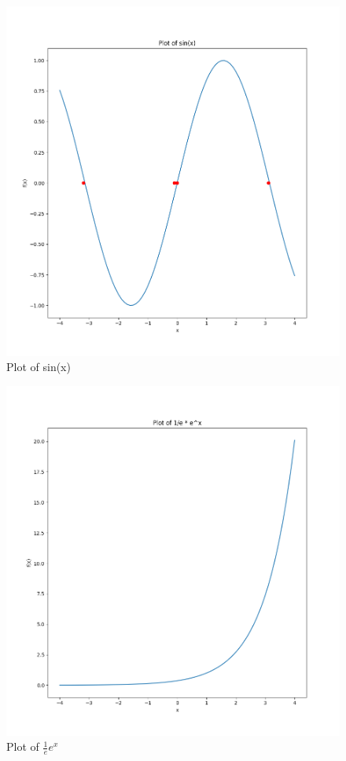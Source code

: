 \documentclass[11pt]{article}
\begin{document}
\begin{figure}[h]
    \centering
    \includegraphics{Figure_2.png}
    \caption{Plot of sin(x)}
    \label{fig:sin}
\end{figure}

\begin{figure}[h]
    \centering
    \includegraphics{Figure_3.png}
    \caption{Plot of $\frac{1}{e}e^x$}
    \label{fig:e}
\end{figure}
\end{document}

